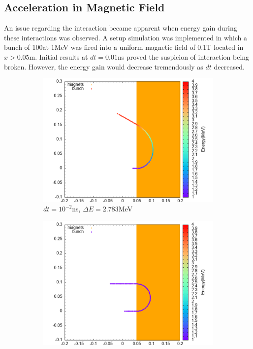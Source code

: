\documentclass[a4paper,oneside,12pt]{report}
\numberwithin{equation}{chapter}
\begin{document}
{\subsection{Acceleration in Magnetic Field}
An issue regarding the \eB interaction became apparent when energy gain during these interactions was observed.
A setup simulation was implemented in which a bunch of 100\e at $1$MeV was fired into a uniform magnetic field of $0.1$T located in $x>0.05$m.
Initial results at $dt=0.01$ns proved the suspicion of \eB interaction being broken. However, the energy gain would decrease tremendously as $dt$ decreased.
\iffalse \begin{figure}
    \centering
    \begin{subfigure}{0.8\textwidth}
        \centering
        \includegraphics[width=\linewidth]{./figures/rhodoSim/mag_lf_001dt.png}
        \caption*{$dt=10^{-2}$ns, $\Delta E=2.783$MeV}
    \end{subfigure}
    \begin{subfigure}{0.8\textwidth}
        \centering
        \includegraphics[width=\linewidth]{./figures/rhodoSim/mag_lf_00001dt.png}

\end{subfigure}
\end{figure}}
\end{document}
